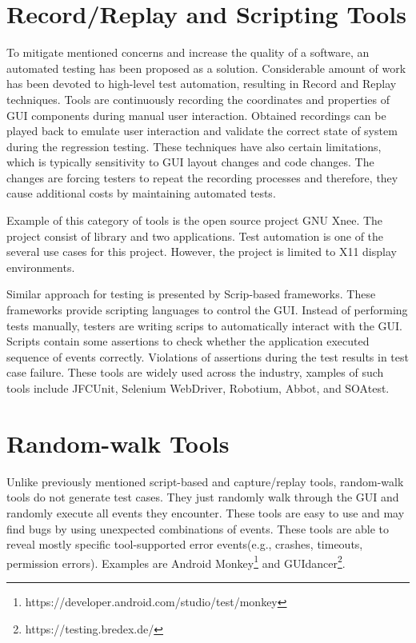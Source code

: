 \section{Record/Replay and Scripting Tools}
To mitigate mentioned concerns and increase the quality of a software, an automated testing has been proposed as a solution. Considerable amount of work has been devoted to high-level test automation, resulting in Record and Replay techniques. Tools are  continuously recording the coordinates and properties of GUI components during manual user interaction. Obtained recordings can be played back to emulate user interaction and validate the correct state of system during the regression testing. These techniques have also certain limitations, which is typically sensitivity to GUI layout changes and code changes. The changes are forcing testers to repeat the recording processes and therefore, they cause additional costs by maintaining automated tests.\cite{guitesting} 

Example of this category of tools is the open source project GNU Xnee. The project consist of library and two applications. Test automation is one of the several use cases for this project. However, the project is limited to X11 display environments.\cite{xnee}

Similar approach for testing is presented by Scrip-based frameworks. These frameworks provide scripting languages to control the GUI. Instead of performing tests manually, testers are writing scrips to automatically interact with the GUI. Scripts contain some assertions to check whether the application executed sequence of events correctly. Violations of assertions during the test results in test case failure. These tools are widely used across the industry, xamples of such tools include JFCUnit, Selenium WebDriver, Robotium, Abbot, and SOAtest.\cite{NguyenBao2014Gait}

\section{Random-walk Tools}
Unlike previously mentioned script-based and capture/replay tools, random-walk tools do not generate test cases. They just randomly walk through the GUI and randomly execute all events they encounter. These tools are easy to use and may find bugs by using unexpected combinations of events. These tools are able to reveal mostly specific tool-supported error events(e.g., crashes, timeouts, permission errors). Examples are Android Monkey\footnote{https://developer.android.com/studio/test/monkey} and GUIdancer\footnote{https://testing.bredex.de/}.


